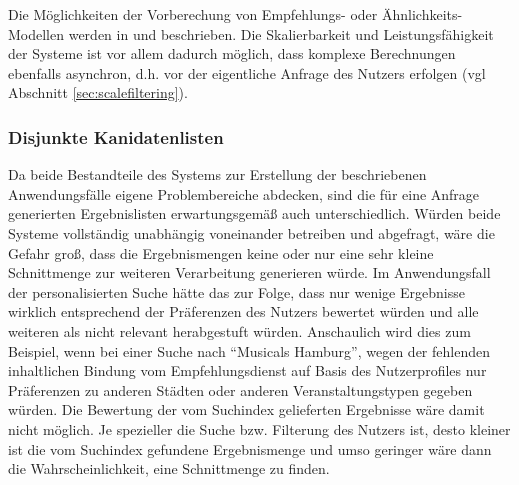 Die Möglichkeiten der Vorberechung von Empfehlungs- oder Ähnlichkeits-Modellen werden in \citep{linden03} und \citep{Das07} beschrieben. Die Skalierbarkeit und Leistungsfähigkeit der Systeme ist vor allem dadurch möglich, dass komplexe Berechnungen ebenfalls asynchron, d.h. vor der eigentliche Anfrage des Nutzers erfolgen (vgl Abschnitt \ref{sec:scalefiltering}).

\subsubsection{Disjunkte Kanidatenlisten}\label{sec:disjunctcanidates}



Da beide Bestandteile des Systems zur Erstellung der beschriebenen Anwendungsfälle eigene Problembereiche abdecken, sind die für eine Anfrage generierten Ergebnislisten erwartungsgemäß auch unterschiedlich. Würden beide Systeme vollständig unabhängig voneinander betreiben und abgefragt, wäre die Gefahr groß, dass die Ergebnismengen keine oder nur eine sehr kleine Schnittmenge zur weiteren Verarbeitung generieren würde. Im Anwendungsfall der personalisierten Suche hätte das zur Folge, dass nur wenige Ergebnisse wirklich entsprechend der Präferenzen des Nutzers bewertet würden und alle weiteren als nicht relevant herabgestuft würden. Anschaulich wird dies zum Beispiel, wenn bei einer Suche nach ``Musicals Hamburg'', wegen der fehlenden inhaltlichen Bindung vom Empfehlungsdienst auf Basis des Nutzerprofiles nur Präferenzen zu anderen Städten oder anderen Veranstaltungstypen gegeben würden. Die Bewertung der vom Suchindex gelieferten Ergebnisse wäre damit nicht möglich. Je spezieller die Suche bzw. Filterung des Nutzers ist, desto kleiner ist die vom Suchindex gefundene Ergebnismenge und umso geringer wäre dann die Wahrscheinlichkeit, eine Schnittmenge zu finden.

